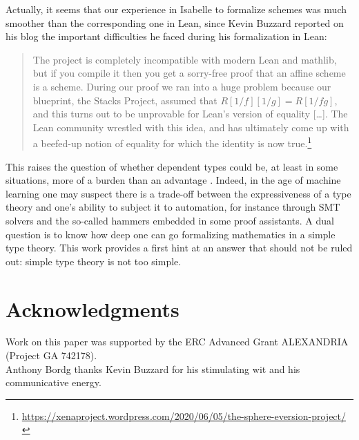 \documentclass[12pt]{scrartcl}
\begin{document}
Actually, it seems that our experience in Isabelle to formalize schemes was much smoother than the corresponding one in Lean, since Kevin Buzzard reported on his blog the important difficulties he faced during his formalization in Lean:
\begin{quote}
	The project is completely incompatible with modern Lean and mathlib, but if you compile it then you get a sorry-free proof that an affine scheme is a scheme. During our proof we ran into a huge problem because our blueprint, the Stacks Project, assumed that $R[1/f][1/g]=R[1/fg]$, and this turns out to be unprovable for Lean’s version of equality [\dots]. The Lean community wrestled with this idea, and has ultimately come up with a beefed-up notion of equality for which the identity is now true.\footnote{\url{https://xenaproject.wordpress.com/2020/06/05/the-sphere-eversion-project/}}
\end{quote}	
This raises the question of whether dependent types could be, at least in some situations, more of a burden than an advantage \cite{PaulsonLamport}. Indeed, in the age of machine learning one may suspect there is a trade-off between the expressiveness of a type theory and one's ability to subject it to automation, for instance through SMT solvers and the so-called hammers embedded in some proof assistants. A dual question is to know how deep one can go formalizing mathematics in a simple type theory. This work provides a first hint at an answer that should not be ruled out: simple type theory is not too simple.       

\section*{Acknowledgments}

Work on this paper was supported by the ERC Advanced Grant ALEXANDRIA (Project GA 742178).  \\
Anthony Bordg thanks Kevin Buzzard for his stimulating wit and his communicative energy.			
\end{document}
